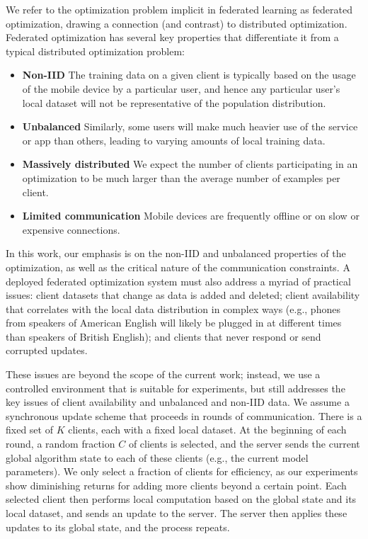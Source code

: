 \documentclass[twoside]{article}
\newcommand{\clientfrac}{\ensuremath{C}}    %
\newcommand{\nc}{K}
\begin{document}
We refer to the optimization problem implicit in federated learning as
federated optimization, drawing a connection (and contrast) to
distributed optimization. 
Federated optimization has several key properties
that differentiate it from a typical distributed optimization
problem:
\begin{itemize}
\item \textbf{Non-IID} The training data on a given client is
  typically based on the usage of the mobile device by a particular
  user, and hence any particular user's local dataset will not be
  representative of the population distribution.
\item \textbf{Unbalanced} Similarly, some users will make much heavier
  use of the service or app than others, leading to varying amounts of
  local training data.
\item \textbf{Massively distributed} We expect the number of clients
  participating in an optimization to be much larger than the average
  number of examples per client.
\item \textbf{Limited communication} Mobile devices are frequently
  offline or on slow or expensive connections.
\end{itemize}
In this work, our emphasis is on the non-IID and unbalanced properties
of the optimization, as well as the critical nature of the
communication constraints.
A deployed federated optimization system must also address a myriad of
practical issues: client datasets that change as data is added and
deleted; client availability that correlates with the local data
distribution in complex ways (e.g., phones from speakers of
  American English will likely be plugged in at different times than
  speakers of British English); and clients that never respond or
send corrupted updates.

These issues are beyond the scope of the current work; instead, we use
a controlled environment that is suitable for experiments, but still
addresses the key issues of client availability and unbalanced and
non-IID data. We assume a synchronous update scheme that proceeds in
rounds of communication.  There is a fixed set of $\nc$ clients, each
with a fixed local dataset. At the beginning of each round, a random
fraction $\clientfrac$ of clients is selected, and the server sends
the current global algorithm state to each of these clients (e.g., the
current model parameters). We only select a fraction of clients for
efficiency, as our experiments show diminishing returns for adding
more clients beyond a certain point. Each selected client then
performs local computation based on the global state and its local
dataset, and sends an update to the server. The server then applies
these updates to its global state, and the process repeats.
\end{document}
